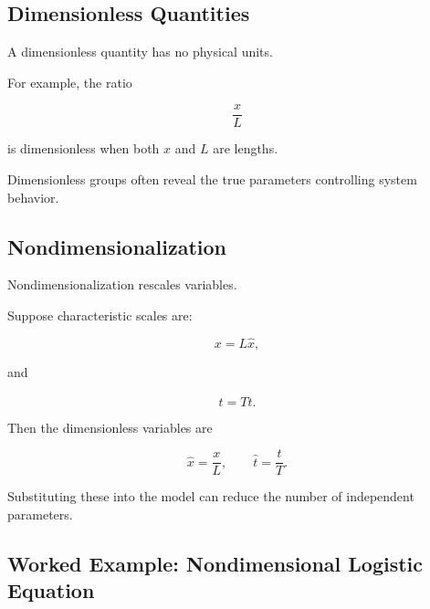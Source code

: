 \subsection{Dimensionless Quantities}
\label{subsec:dimensionless-quantities}

A dimensionless quantity has no physical units.

For example, the ratio

\[
\boxed{
\frac{x}{L}
}
\]

is dimensionless when both \(x\) and \(L\) are lengths.

Dimensionless groups often reveal the true parameters controlling system
behavior.

\subsection{Nondimensionalization}
\label{subsec:nondimensionalization}

Nondimensionalization rescales variables.

Suppose characteristic scales are:

\[
\boxed{
x=L\hat{x},
}
\]

and

\[
\boxed{
t=T\hat{t}.
}
\]

Then the dimensionless variables are

\[
\boxed{
\hat{x}=\frac{x}{L},
\qquad
\hat{t}=\frac{t}{T}.
}
\]

Substituting these into the model can reduce the number of independent
parameters.

\subsection{Worked Example: Nondimensional Logistic Equation}
\label{subsec:worked-nondimensional-logistic}

